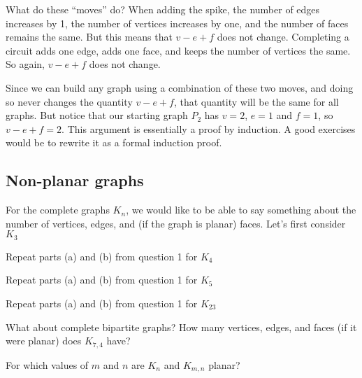 \documentclass[12pt]{article}
\begin{document}
What do these ``moves'' do?  When adding the spike, the number of edges increases by 1, the number of vertices increases by one, and the number of faces remains the same.  But this means that $v - e + f$ does not change.  Completing a circuit adds one edge, adds one face, and keeps the number of vertices the same.  So again, $v - e + f$ does not change.  

Since we can build any graph using a combination of these two moves, and doing so never changes the quantity $v - e + f$, that quantity will be the same for all graphs.  But notice that our starting graph $P_2$ has $v = 2$, $e = 1$ and $f = 1$, so $v - e + f = 2$.  This argument is essentially a proof by induction.  A good exercises would be to rewrite it as a formal induction proof.

\subsection{Non-planar graphs}

\begin{activity}
\begin{questions}
\question For the complete graphs $K_n$, we would like to be able to say something about the number of vertices, edges, and (if the graph is planar) faces. Let's first consider $K_3$
\question Repeat parts (a) and (b) from question 1 for $K_4$ 

\question Repeat parts (a) and (b) from question 1 for $K_5$

\question Repeat parts (a) and (b) from question 1 for $K_{23}$


\question What about complete bipartite graphs?  How many vertices, edges, and faces (if it were planar) does $K_{7,4}$ have?

\question For which values of $m$ and $n$ are $K_n$ and $K_{m,n}$ planar?
\end{questions}
\end{activity}
\end{document}
